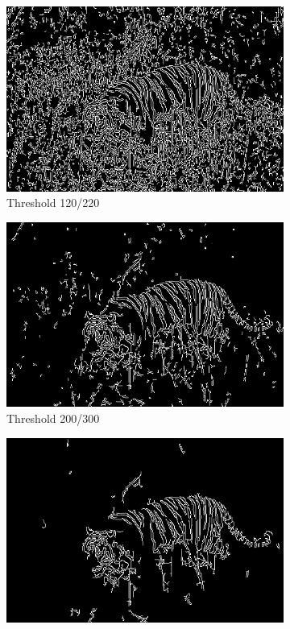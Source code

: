 \documentclass[12pt]{article}
\begin{document}
\begin{figure}[H]
	\centering  %
	\begin{subfigure}{0.32\textwidth}
		\centering
		\includegraphics[width=\textwidth]{TigerCanny120_220.jpg}
		\caption{Threshold 120/220}
		\label{fig:tigerCanny.120_220}
	\end{subfigure}
	\hfill
	\begin{subfigure}{0.32\textwidth}
		\centering
		\includegraphics[width=\textwidth]{TigerCanny200_400.jpg}
		\caption{Threshold 200/300}
		\label{fig:tigerCanny.200_400}
	\end{subfigure}
	\hfill
	\begin{subfigure}{0.32\textwidth}
		\centering
		\includegraphics[width=\textwidth]{TigerCanny180_600.jpg}

\end{subfigure}
\end{figure}
\end{document}
